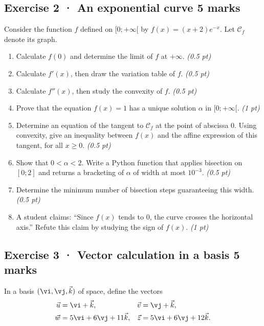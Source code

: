 \subsection*{Exercise 2 · An exponential curve \hfill 5 marks}Consider the function $f$ defined on $[0;+\infty[$ by $f(x)=(x+2)e^{-x}$. Let $\mathcal C_f$ denote its graph.

\begin{enumerate}

\item Calculate $f(0)$ and determine the limit of $f$ at $+\infty$. \hfill\textit{(0.5 pt)}

\item Calculate $f'(x)$, then draw the variation table of $f$. \hfill\textit{(0.5 pt)}

\item Calculate $f''(x)$, then study the convexity of $f$. \hfill\textit{(0.5 pt)}

\item Prove that the equation $f(x)=1$ has a unique solution $\alpha$ in $[0;+\infty[$. \hfill\textit{(1 pt)}

\item Determine an equation of the tangent to $\mathcal C_f$ at the point of abscissa $0$. Using convexity, give an inequality between $f(x)$ and the affine expression of this tangent, for all $x\ge0$. \hfill\textit{(0.5 pt)}

\item Show that $0<\alpha<2$. Write a Python function that applies bisection on $[0;2]$ and returns a bracketing of $\alpha$ of width at most $10^{-3}$. \hfill\textit{(0.5 pt)}

\item Determine the minimum number of bisection steps guaranteeing this width. \hfill\textit{(0.5 pt)}

\clearpage\item A student claims: ``Since $f(x)$ tends to $0$, the curve crosses the horizontal axis.'' Refute this claim by studying the sign of $f(x)$. \hfill\textit{(1 pt)}

\end{enumerate}

\clearpage{}\par

\subsection*{Exercise 3 · Vector calculation in a basis \hfill 5 marks}In a basis $(\vi,\vj,\vec k)$ of space, define the vectors
\[\begin{aligned}\vec u&=\vi+\vec k,&\vec v&=\vj+\vec k,\\
\vec w&=5\vi+6\vj+11\vec k,&\vec z&=5\vi+6\vj+12\vec k.\end{aligned}\]

